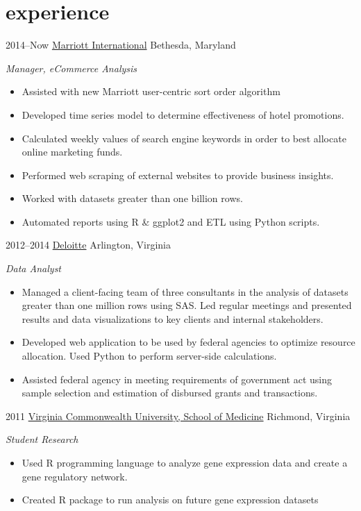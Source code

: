 \documentclass[]{friggeri-cv} %
\begin{document}

\section{experience}

\begin{entrylist}
\entry
{2014--Now}
{\href{http://www.marriott.com/}{Marriott International}}
{Bethesda, Maryland}
{\emph{Manager, eCommerce Analysis}
\begin{itemize}
\renewcommand\labelitemi{--}
\item Assisted with new Marriott user-centric sort order algorithm
\item Developed time series model to determine effectiveness of hotel promotions. 
\item Calculated weekly values of search engine keywords in order to best allocate online marketing funds.
\item Performed web scraping of external websites to provide business insights.
\item Worked with datasets greater than one billion rows.
\item Automated reports using R \& ggplot2 and ETL using Python scripts.
\end{itemize}
}
\entry
{2012--2014}
{\href{http://www.deloitte.com/}{Deloitte}}
{Arlington, Virginia}
{\emph{Data Analyst}
\begin{itemize}
\renewcommand\labelitemi{--}
\item Managed a client-facing team of three consultants in the analysis of datasets greater than one million rows using SAS. 
Led regular meetings and presented results and data visualizations to key clients and internal stakeholders.
\item Developed web application to be used by federal agencies to optimize resource allocation. 
Used Python to perform server-side calculations.
\item Assisted federal agency in meeting requirements of government act using sample selection and estimation of disbursed grants and transactions.
\end{itemize}
}
\entry
{2011}
{\href{http://www.medschool.vcu.edu}{Virginia Commonwealth University, School of Medicine}}
{Richmond, Virginia}
{\emph{Student Research}
\begin{itemize}
\renewcommand\labelitemi{--}
\item Used R programming language to analyze gene expression data and create a gene regulatory network.
\item Created R package to run analysis on future gene expression datasets
\end{itemize}
}
\end{entrylist}
\end{document}
